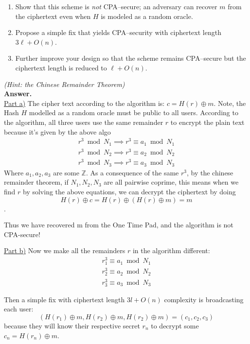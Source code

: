 \documentclass[12pt]{article}
\newcommand{\Z}{\mathbb{Z}}
\newcommand{\xor}{\oplus}
\begin{document}
\begin{enumerate}[label=\alph*]
    \item Show that this scheme is \emph{not} CPA–secure; an adversary can recover $m$ from the ciphertext even when $H$ is modeled as a random oracle.
    \item Propose a simple fix that yields CPA–security with ciphertext length $3\ell + O(n)$.
    \item Further improve your design so that the scheme remains CPA–secure but the ciphertext length is reduced to $\ell + O(n)$.
\end{enumerate}
\vspace*{0.3em}\hfill\textit{(Hint: the Chinese Remainder Theorem)}
\\
\textbf{Answer.}
\\

\underline{Part a)}
The cipher text according to the algorithm is: $c = H(r) \xor m$. Note, the Hash $H$ modelled as a
random oracle must be public to all users.
According to the algorithm, all three users use the same remainder $r$ to encrypt the plain text
because it's given by the above algo 
\begin{align}
r^{3} \bmod N_1 \implies r^{3} \equiv a_1 \bmod N_1
\\
r^{3} \bmod N_2 \implies r^{3} \equiv a_2 \bmod N_2
\\
r^{3} \bmod N_3 \implies r^{3} \equiv a_3 \bmod N_3
\end{align}
Where $a_1, a_2, a_3$ are some $\Z$. As a consequence of the same $r^3$,
by the chinese remainder theorem, if $N_1, N_2, N_3$ are all pairwise coprime, this means 
when we find $r$ by solving the above equations, we can decrypt the ciphertext by doing 
\[H(r) \xor c = H(r) \xor (H(r) \xor m) = m\].

Thus we have recovered m from the One Time Pad, and the algorithm is not CPA-secure!

\underline{Part b)}
Now we make all the remainders $r$ in the algorithm different:
\begin{align}
r_1^{3} \equiv a_1 \bmod N_1
\\
r_2^{3} \equiv a_2 \bmod N_2
\\
r_3^{3} \equiv a_3 \bmod N_3
\end{align}

Then a simple fix with ciphertext length $3l + O(n)$ complexity is broadcasting each user:
\[(H(r_1) \xor m, H(r_2) \xor m, H(r_2) \xor m) = (c_1, c_2, c_3)\]
because they will know their respective secret $r_n$ to decrypt some $c_n = H(r_n) \xor m$.
\end{document}
